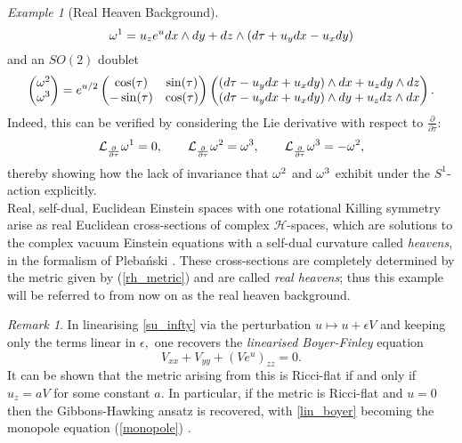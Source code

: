 \documentclass[a4paper,12pt, onecolumn, notitlepage]{article}
\theoremstyle{definition}
\theoremstyle{remark}
\newtheorem{rmk}[thm]{Remark}
\newtheorem{ex}[thm]{Example}
\newcommand{\w}{\omega}
\newcommand{\e}{\epsilon}
\newcommand{\ddt}[1]{\frac{\partial #1}{\partial \tau}}
\begin{document}
\begin{ex}[Real Heaven Background]
	\begin{equation}
	\label{su_k1}
		\w\indices{^1} = u_{z}e^{u}dx\wedge dy + dz \wedge (d\tau + u_{y}dx - u_{x}dy)
	\end{equation}
	and an $SO(2)$ doublet \cite{bakas_1995}
	\begin{equation}
	\label{su_k23}
		\begin{pmatrix}
		\w\indices{^2}\\
		\w\indices{^3}
		\end{pmatrix}
		=
		e^{u/2}
		\begin{pmatrix}
		\cos(\tau) & \sin(\tau) \\
		-\sin(\tau) & \cos(\tau)
		\end{pmatrix}
		\begin{pmatrix}
		(d\tau - u_{y}dx+u_{x}dy)\wedge dx + u_{z}dy\wedge dz\\
		(d\tau - u_{y}dx+u_{x}dy) \wedge dy + u_{z}dz\wedge dx
		\end{pmatrix}.
	\end{equation}
	Indeed, this can be verified by considering the Lie derivative with respect to $\ddt{}:$
	\begin{equation*}
		\mathcal{L}_{\ddt{}}\w\indices{^1}=0,\qquad \mathcal{L}_{\ddt{}}\w\indices{^2}=\w\indices{^3},\qquad
		\mathcal{L}_{\ddt{}}\w\indices{^3}= -\w\indices{^2},
	\end{equation*}
	thereby showing how the lack of invariance that $\w\indices{^2}$ and $\w\indices{^3}$ exhibit under the $S^{1}$-action explicitly.\\
	Real, self-dual, Euclidean Einstein spaces with one rotational Killing symmetry arise as real Euclidean cross-sections of complex $\mathcal{H}$-spaces, which are solutions to the complex vacuum Einstein equations with a self-dual curvature called \emph{heavens}, in the formalism of Pleba\'nski \cite{plebanski_1975,park_1990}. These cross-sections are completely determined by the metric given by (\ref{rh_metric}) and are called \emph{real heavens}; thus this example will be referred to from now on as the real heaven background.\\
\end{ex}

\begin{rmk}
	In linearising \cref{su_infty} via the perturbation $u\mapsto u + \e V$ and keeping only the terms linear in $\e,$ one recovers the \emph{linearised Boyer-Finley} equation
	\begin{equation}
		\label{lin_boyer}
		V_{xx} + V_{yy} + (Ve^{u})_{zz}=0. 
	\end{equation}
	It can be shown that the metric arising from this is Ricci-flat if and only if $u_{z} = aV$ for some constant $a.$ In particular, if the metric is Ricci-flat and $u=0$ then the Gibbons-Hawking ansatz is recovered, with \cref{lin_boyer} becoming the monopole equation (\ref{monopole}) \cite{lebrun_1991}.
\end{rmk}
\end{document}

